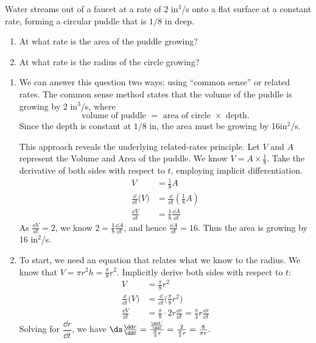 \begin{example}\label{ex_rr2}
Water streams out of a faucet at a rate of $2$ in$^3$/s onto a flat surface at a constant rate, forming a circular puddle that is $1/8$ in deep. 
\begin{enumerate}
	\item	At what rate is the area of the puddle growing?
	\item	At what rate is the radius of the circle growing?
\end{enumerate}
\solution
\begin{enumerate}
\item We can answer this question two ways: using ``common sense'' or related rates. The common sense method states that the volume of the puddle is growing by $2$ in$^3$/s, where
\[\text{volume of puddle } = \text{ area of circle } \times \text{ depth.}\]
Since the depth is constant at $1/8$ in, the area must be growing by 16in$^2$/s.

This approach reveals the underlying related-rates principle. Let $V$ and $A$ represent the Volume and Area of the puddle. We know $V= A\times \frac18$. Take the derivative of both sides with respect to $t$, employing implicit differentiation.
\begin{align*}
V &= \frac18A\\
\frac{\dd}{\dd t}\bigl(V\bigr) &= \frac{\dd}{\dd t}\left(\frac18A\right)\\
\frac{\dd V}{\dd t} &= \frac18\frac{\dd A}{\dd t}
\end{align*} 
As $\frac{\dd V}{\dd t} = 2$, we know $2 = \frac18\frac{\dd A}{\dd t}$, and hence $\frac{\dd A}{\dd t} = 16$. Thus the area is growing by 16 in$^2$/s.

\item		To start, we need an equation that relates what we know to the radius.
We know that $V=\pi r^2h=\frac\pi8r^2$.  Implicitly derive both sides with respect to $t$:
\begin{align*}
 V &= \frac\pi8 r^2 \\
 \frac{\dd}{\dd t}\bigl(V\bigr) &= \frac{\dd}{\dd t}\bigl(\frac\pi8 r^2\bigr) \\
 \frac{\dd V}{\dd t} &= \frac\pi8\cdot2r\frac{\dd r}{\dd t}=\frac\pi4 r\frac{\dd r}{\dd t}
\end{align*}
Solving for $\dfrac{\dd r}{\dd t}$, we have
$\ds
\frac{\dd r}{\dd t}=\frac{\frac{\dd V}{\dd t}}{\frac\pi4 r}
=\frac{2}{\frac\pi4 r}=\frac8{\pi r}.
$
%
%


\end{enumerate}
\end{example}
